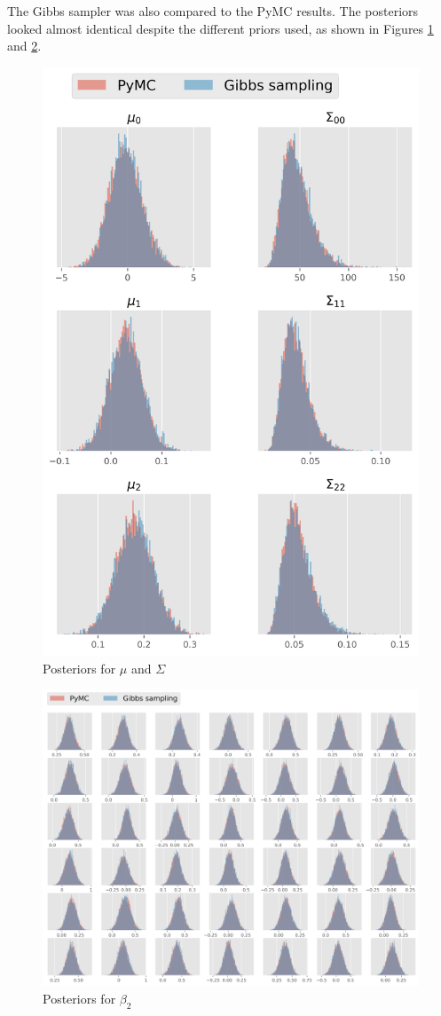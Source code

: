 \documentclass[paper=a4, fontsize=11pt]{scrartcl}
\begin{document}
The Gibbs sampler was also compared to the PyMC results. The posteriors looked almost identical despite the different priors used, as shown in Figures \ref{pymc1} and \ref{pymc2}. 
\begin{figure}[!htb]\label{pymc1}
\centering
\includegraphics[width=.4\textwidth]{project/writeup/compare_gibbs_pymc1.png}
\caption{Posteriors for $\mu$ and $\Sigma$}
\end{figure}
\begin{figure}[!htb]\label{pymc2}
\centering
\includegraphics[width=.85\textwidth]{project/writeup/compare_gibbs_pymc2.png}
\caption{Posteriors for $\beta_2$}
\end{figure}

\newpage
\end{document}
